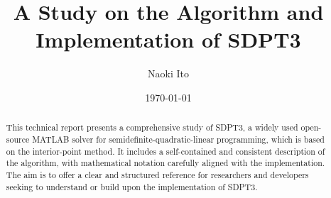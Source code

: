 \documentclass{scrartcl}
\title{A Study on the Algorithm and Implementation of SDPT3}
\author{
    Naoki Ito
}
\date{\today}
\begin{document}
\maketitle
\begin{abstract}
This technical report presents a comprehensive study of SDPT3, a widely used open-source MATLAB solver for semidefinite-quadratic-linear programming, which is based on the interior-point method.
It includes a self-contained and consistent description of the algorithm, with mathematical notation carefully aligned with the implementation.
The aim is to offer a clear and structured reference for researchers and developers seeking to understand or build upon the implementation of SDPT3.
\end{abstract}

\tableofcontents












\end{document}
